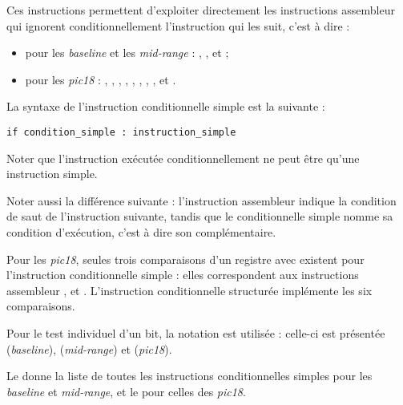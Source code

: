 
Ces instructions permettent d'exploiter directement les instructions assembleur qui ignorent conditionnellement l'instruction qui les suit, c'est à dire :
\begin{itemize}
\item pour les \emph{baseline} et les \emph{mid-range} : , ,  et  ;
\item pour les \emph{pic18} : , , , , , , , ,  et .
\end{itemize}

La syntaxe de l'instruction conditionnelle simple est la suivante :

\begin{lstlisting}[language=piccolo]
if condition_simple : instruction_simple
\end{lstlisting}

Noter que l'instruction exécutée conditionnellement ne peut être qu'une instruction simple.

Noter aussi la différence suivante : l'instruction assembleur indique la condition de saut de l'instruction suivante, tandis que le conditionnelle simple nomme sa condition d'exécution, c'est à dire son complémentaire.

Pour les \emph{pic18}, seules trois comparaisons d'un registre avec  existent pour l'instruction conditionnelle simple : elles correspondent aux instructions assembleur ,  et . L'instruction conditionnelle structurée implémente les six comparaisons.

Pour le test individuel d'un bit, la notation  est utilisée : celle-ci est présentée  (\emph{baseline}),  (\emph{mid-range}) et  (\emph{pic18}).

Le  donne la liste de toutes les instructions conditionnelles simples pour les \emph{baseline} et \emph{mid-range}, et le  pour celles des \emph{pic18}.

